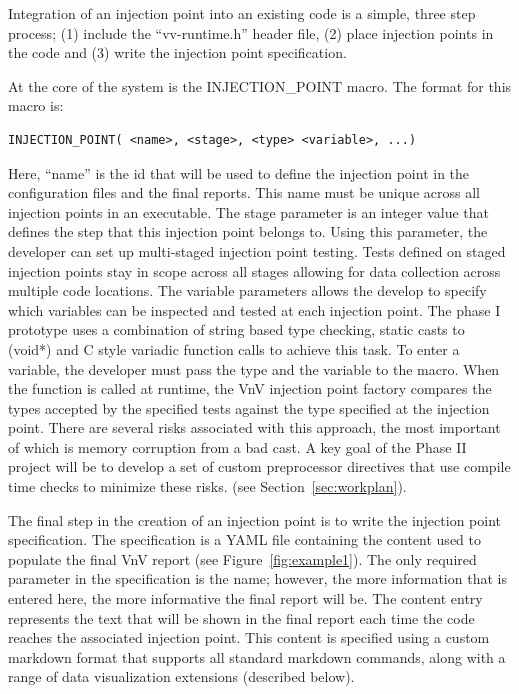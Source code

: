 Integration of an injection point into an existing code is a simple, three step process; (1) include the ``vv-runtime.h'' header file, (2) place injection points in the code and (3) write the injection point specification. 

At the core of the system is the INJECTION\_POINT macro. The format for this macro is:

\begin{verbatim} 
INJECTION_POINT( <name>, <stage>, <type> <variable>, ...)
\end{verbatim}

Here, ``name'' is the id that will be used to define the injection point in the configuration files and the final reports. This name must 
be unique across all injection points in an executable. The stage parameter is an integer value that defines the step that this injection point belongs to. Using this parameter, the developer can set up multi-staged injection point testing. Tests defined on staged injection points stay in scope across 
all stages allowing for data collection across multiple code locations. The variable parameters allows the develop to specify which variables can be inspected and tested at each injection point. The phase I prototype uses a combination of string based type checking, static casts to (void*) and C style variadic function calls to achieve this task. To enter a variable, the developer must pass the type and the variable to the macro. When the function is called at runtime, the VnV injection point factory compares the types accepted by the specified tests against the type specified at the injection point. There are several risks associated with this approach, the most important of which is memory corruption from a bad cast. A key goal of the Phase II project will be to develop a set of custom preprocessor directives that use compile time checks to minimize these risks. (see Section~\ref{sec:workplan}).

The final step in the creation of an injection point is to write the injection point specification. The specification is a YAML file containing the content used to populate the final VnV report (see Figure~\ref{fig:example1}). The only required parameter in the specification is the name; however, the more information that is entered here, the more informative the final report will be. The content entry represents the text that will be shown in the final report each time the code reaches the associated injection point. This content is specified  using a custom markdown format that supports all standard markdown commands, along with a range of data visualization extensions (described below). 

